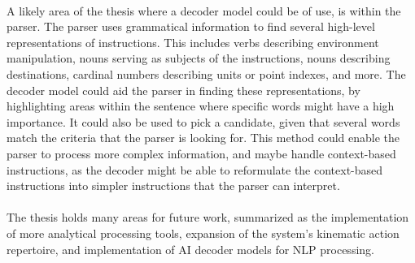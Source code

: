 \\
A likely area of the thesis where a decoder model could be of use, is within the parser. The parser uses grammatical information to find several high-level representations of instructions. This includes verbs describing environment manipulation, nouns serving as subjects of the instructions, nouns describing destinations, cardinal numbers describing units or point indexes, and more. The decoder model could aid the parser in finding these representations, by highlighting areas within the sentence where specific words might have a high importance. It could also be used to pick a candidate, given that several words match the criteria that the parser is looking for. This method could enable the parser to process more complex information, and maybe handle context-based instructions, as the decoder might be able to reformulate the context-based instructions into simpler instructions that the parser can interpret.
\\\\
The thesis holds many areas for future work, summarized as the implementation of more analytical processing tools, expansion of the system's kinematic action repertoire, and implementation of AI decoder models for NLP processing.